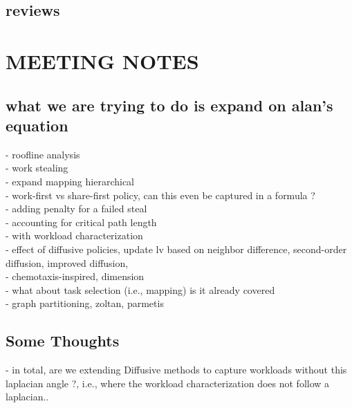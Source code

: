 \documentclass{article}
\begin{document}
\cite{Gao:2017:MPL:3110224.3110240}
\cite{CAMPOS20001213}
\cite{PINAR2004974}
\cite{7551381}
\cite{Menon:2013:DDL:2503210.2503284}
\cite{Liu:2017}
\cite{SEVERIUKHINA2017139}
\cite{7965131}


\subsection{reviews}

\cite{Teresco_2partitioning}

\section{MEETING NOTES}

\subsection{what we are trying to do is expand on alan's equation}
	- roofline analysis\\
	- work stealing \\
	- expand mapping hierarchical \\
	- work-first vs share-first policy, can this even be captured in a formula ? \\
	- adding penalty for a failed steal\\
	- accounting for critical path length\\
	- with workload characterization\\
		- effect of diffusive policies, update lv based on neighbor difference, second-order diffusion, improved diffusion,\\
 		- chemotaxis-inspired, dimension \\

	- what about task selection (i.e., mapping) is it already covered\\

	- graph partitioning, zoltan, parmetis\\
\subsection{Some Thoughts}
- in total, are we extending Diffusive methods to capture workloads without this laplacian angle ?, i.e., where the workload characterization does not follow a  laplacian.. \\
\end{document}
